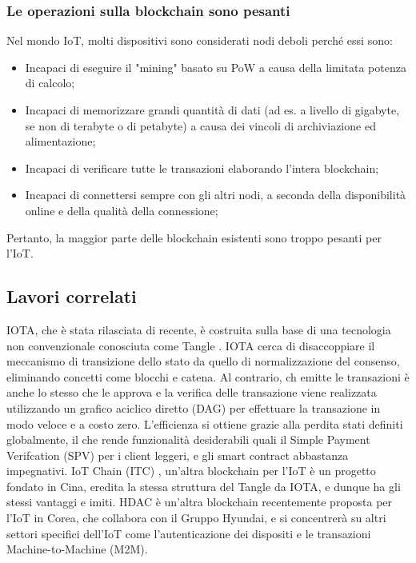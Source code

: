 \subsubsection{Le operazioni sulla blockchain sono pesanti}
Nel mondo IoT, molti dispositivi sono considerati nodi deboli perché essi sono:
\begin{itemize}
	\item
	      Incapaci di eseguire il "mining" basato su PoW a causa della limitata potenza di calcolo;
	\item
	      Incapaci di memorizzare grandi quantità di dati (ad es. a livello di gigabyte, se non di terabyte o di petabyte) a causa dei vincoli di archiviazione ed alimentazione;
	\item
	      Incapaci di verificare tutte le transazioni elaborando l'intera blockchain;
	\item
	      Incapaci di connettersi sempre con gli altri nodi, a seconda della disponibilità online e della qualità della connessione;
\end{itemize}
Pertanto, la maggior parte delle blockchain esistenti sono troppo pesanti per l'IoT.

\subsection{Lavori correlati}
IOTA, che è stata rilasciata di recente, è costruita sulla base di una tecnologia non convenzionale conosciuta come Tangle \cite{c24}. IOTA cerca di disaccoppiare il meccanismo di transizione dello stato da quello di normalizzazione del consenso, eliminando concetti come blocchi e catena. Al contrario, ch emitte le transazioni è anche lo stesso che le approva e la verifica delle transazione viene realizzata utilizzando un grafico aciclico diretto (DAG) per effettuare la transazione in modo veloce e a costo zero. L'efficienza si ottiene grazie alla perdita stati definiti globalmente, il che rende funzionalità desiderabili quali il Simple Payment Verifcation (SPV) per i client leggeri, e gli smart contract abbastanza impegnativi. IoT Chain (ITC) \cite{c16}, un'altra blockchain per l'IoT è un progetto fondato in Cina, eredita la stessa struttura del Tangle da IOTA, e dunque ha gli stessi vantaggi e imiti. HDAC \cite{c13} è un'altra blockchain recentemente proposta per l'IoT in Corea, che collabora con il Gruppo Hyundai, e si concentrerà su altri settori specifici dell'IoT come l'autenticazione dei dispositi e le transazioni Machine-to-Machine (M2M).
